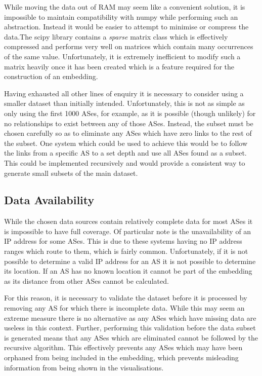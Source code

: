 While moving the data out of RAM may seem like a convenient solution, it is impossible to maintain compatibility with numpy while performing such an abstraction. Instead it would be easier to attempt to minimise or compress the data.The scipy library contains a \textit{sparse} matrix class which is effectively compressed and performs very well on matrices which contain many occurrences of the same value. Unfortunately, it is extremely inefficient to modify such a matrix heavily once it has been created which is a feature required for the construction of an embedding. 

Having exhausted all other lines of enquiry it is necessary to consider using a smaller dataset than initially intended. Unfortunately, this is not as simple as only using the first 1000 ASes, for example, as it is possible (though unlikely) for no relationships to exist between any of those ASes. Instead, the subset must be chosen carefully so as to eliminate any ASes which have zero links to the rest of the subset. One system which could be used to achieve this would be to follow the links from a specific AS to a set depth and use all ASes found as a subset. This could be implemented recursively and would provide a consistent way to generate small subsets of the main dataset.

\subsection{Data Availability}
While the chosen data sources contain relatively complete data for most ASes it is impossible to have full coverage. Of particular note is the unavailability of an IP address for some ASes. This is due to these systems having no IP address ranges which route to them, which is fairly common. Unfortunately, if it is not possible to determine a valid IP address for an AS it is not possible to determine its location. If an AS has no known location it cannot be part of the embedding as its distance from other ASes cannot be calculated. 

For this reason, it is necessary to validate the dataset before it is processed by removing any AS for which there is incomplete data. While this may seem an extreme measure there is no alternative as any ASes which have missing data are useless in this context. Further, performing this validation before the data subset is generated means that any ASes which are eliminated cannot be followed by the recursive algorithm. This effectively prevents any ASes which may have been orphaned from being included in the embedding, which prevents misleading information from being shown in the visualisations. 

